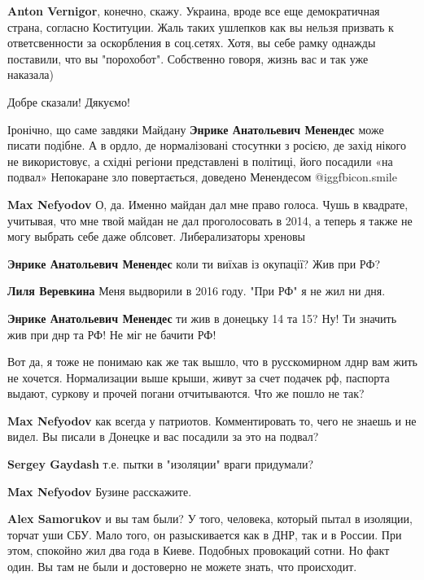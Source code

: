 \begin{itemize}
\begin{itemize}
\textbf{Anton Vernigor}, конечно, скажу. Украина, вроде все еще демократичная страна, согласно Коституции. Жаль таких ушлепков как вы нельзя призвать к ответсвенности за оскорбления в соц.сетях. Хотя, вы себе рамку однажды поставили, что вы "порохобот". Собственно говоря, жизнь вас и так уже наказала)
\end{itemize} %

Добре сказали! Дякуємо!


Іронічно, що саме завдяки Майдану \textbf{Энрике Анатольевич Менендес} може
писати подібне. А в ордло, де нормалізовані стосутнки з росією, де захід нікого
не використовує, а східні регіони представлені в політиці, його посадили «на
подвал» Непокаране зло повертається, доведено Менендесом  @igg{fbicon.smile} 

\begin{itemize} %
\textbf{Max Nefyodov} О, да. Именно майдан дал мне право голоса.
Чушь в квадрате, учитывая, что мне твой майдан не дал проголосовать в 2014, а теперь я также не могу выбрать себе даже облсовет.
Либерализаторы хреновы

\textbf{Энрике Анатольевич Менендес} коли ти виїхав із окупації? Жив при РФ?

\textbf{Лиля Веревкина} Меня выдворили в 2016 году. "При РФ" я не жил ни дня.

\textbf{Энрике Анатольевич Менендес} ти жив в донецьку 14 та 15? Ну! Ти значить жив при днр та РФ! Не міг не бачити РФ!


Вот да, я тоже не понимаю как же так вышло, что в русскомирном лднр вам жить не
хочется. Нормализации выше крыши, живут за счет подачек рф, паспорта выдают,
суркову и прочей погани отчитываются. Что же пошло не так?

\textbf{Max Nefyodov} как всегда у патриотов. Комментировать то, чего не знаешь и не видел. Вы писали в Донецке и вас посадили за это на подвал?

\textbf{Sergey Gaydash} т.е. пытки в "изоляции" враги придумали?

\textbf{Max Nefyodov}
Бузине расскажите.

\textbf{Alex Samorukov} и вы там были? У того, человека, который пытал в изоляции, торчат уши СБУ. Мало того, он разыскивается как в ДНР, так и в России. При этом, спокойно жил два года в Киеве. Подобных провокаций сотни. Но факт один. Вы там не были и достоверно не можете знать, что происходит.


\end{itemize}
\end{itemize}
